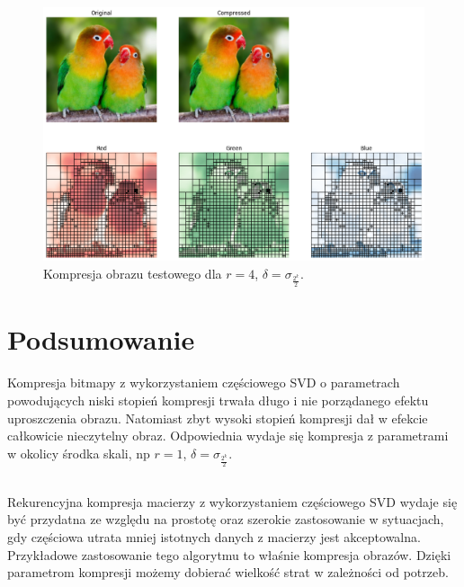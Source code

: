 \documentclass[11pt, leqno]{scrartcl}
\begin{document}
    \begin{figure}[H]
        \centering
        \includegraphics[width=0.9\linewidth]{r4sigma05k.png}
        \caption{Kompresja obrazu testowego dla $r=4$, $\delta =\sigma_\frac{2^k}{2}$.}
    \end{figure}

    \section{Podsumowanie}
    Kompresja bitmapy z wykorzystaniem częściowego SVD o parametrach
    powodujących niski stopień kompresji trwała długo i nie
    porządanego efektu uproszczenia obrazu. Natomiast zbyt wysoki
    stopień kompresji dał w efekcie całkowicie nieczytelny obraz.
    Odpowiednia wydaje się kompresja z parametrami w okolicy środka
    skali, np $r=1$, $\delta =\sigma_\frac{2^k}{2}$.

    \subsection*{}
    Rekurencyjna kompresja macierzy z wykorzystaniem częściowego SVD
    wydaje się być przydatna ze względu na prostotę oraz szerokie
    zastosowanie w sytuacjach, gdy częściowa utrata mniej istotnych
    danych z macierzy jest akceptowalna. Przykładowe zastosowanie
    tego algorytmu to właśnie kompresja obrazów. Dzięki parametrom
    kompresji możemy dobierać wielkość strat w zależności od potrzeb.
\end{document}
